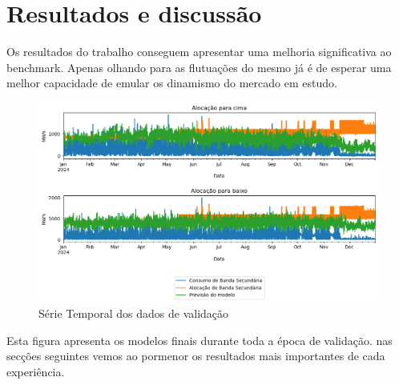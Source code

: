 \chapter{Resultados e discussão}

Os resultados do trabalho conseguem apresentar uma melhoria significativa ao benchmark. Apenas olhando para as flutuações do mesmo já é de esperar uma melhor capacidade de emular os dinamismo do mercado em estudo.\\

\begin{figure}[H]
    \centering
    \includegraphics[width=\textwidth]{plots/alocacoes_finais.png}
    \caption{Série Temporal dos dados de validação}
    \label{fig:modeltimeseries}
\end{figure}

Esta figura apresenta os modelos finais durante toda a época de validação. nas secções seguintes vemos ao pormenor os resultados mais importantes de cada experiência.\\

\thispagestyle{plain}


\thispagestyle{plain}

